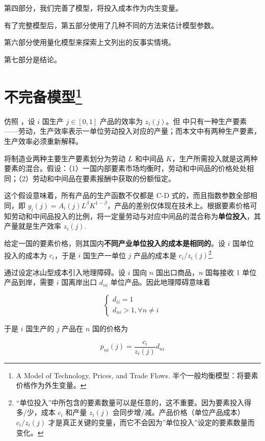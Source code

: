 \documentclass[
]{article}
\begin{document}
第四部分，我们完善了模型，将投入成本作为内生变量。

有了完整模型后，第五部分使用了几种不同的方法来估计模型参数。

第六部分使用量化模型来探索上文列出的反事实情境。

第七部分是结论。

\hypertarget{ux4e0dux5b8cux5907ux6a21ux578b6}{%
\section[不完备模型]{\texorpdfstring{不完备模型\footnote{A Model of Technology, Prices, and Trade Flows.
  半个一般均衡模型：将要素价格作为外生变量。}}{不完备模型}}\label{ux4e0dux5b8cux5907ux6a21ux578b6}}

仿照 \citet{DFS1977}，设 \(i\) 国生产 \(j\in[0,1]\) 产品的效率为 \(z_i(j)\)。但 \citet{DFS1977}
中只有一种生产要素------劳动，生产效率表示一单位劳动投入对应的产量；而本文中有两种生产要素，生产效率必须重新解释。

将制造业两种主要生产要素划分为劳动 \(L\) 和中间品 \(K\)，生产所需投入就是这两种要素的混合。假设：（1）一国内部要素市场均衡时，劳动和中间品的价格处处相同；（2）劳动和中间品在要素报酬中获取的份额恒定。

这个假设意味着，所有产品的生产函数不仅都是 C-D 式的，而且指数参数全部相同，即
\(y_i(j)=A_i(j)L^\beta K^{1-\beta}\)，产品的差别仅体现在技术上。根据要素价格可知劳动和中间品投入的比例，将一定量劳动与对应中间品的混合称为\textbf{单位投入}，其产量就是生产效率
\(z_i(j)\).

给定一国的要素价格，则其国内\textbf{不同产业单位投入的成本是相同的}。设 \(i\)
国单位投入的成本为 \(c_i\)，于是 \(i\) 国生产一单位 \(j\) 产品的成本是
\({c_i}/{z_i(j)}\)\footnote{``单位投入''中所包含的要素数量可以是任意的，这不重要。因为要素投入得多/少，成本
  \(c_i\) 和产量 \(z_i(j)\) 会同步增/减。产品价格（单位产品成本） \({c_i}/{z_i(j)}\)
  才是真正关键的变量，而它不会因为''单位投入''设定的要素数量而变化。}.

通过设定冰山型成本引入地理障碍。设 \(i\) 国向 \(n\) 国出口商品，\(n\) 国每接收 1
单位产品到岸，需要 \(i\) 国离岸出口 \(d_{ni}\) 单位产品。因此地理障碍意味着

\[
\left\{\begin{array}{c}{d_{i i}=1} \\ {d_{n i}>1, \forall n \neq i}\end{array}\right.
\]

于是 \(i\) 国生产的 \(j\) 产品在 \(n\) 国的价格为

\[
p_{ni}(j)=\frac {c_i}{z_i(j)} d_{ni}  \tag{1}
\]
\end{document}
